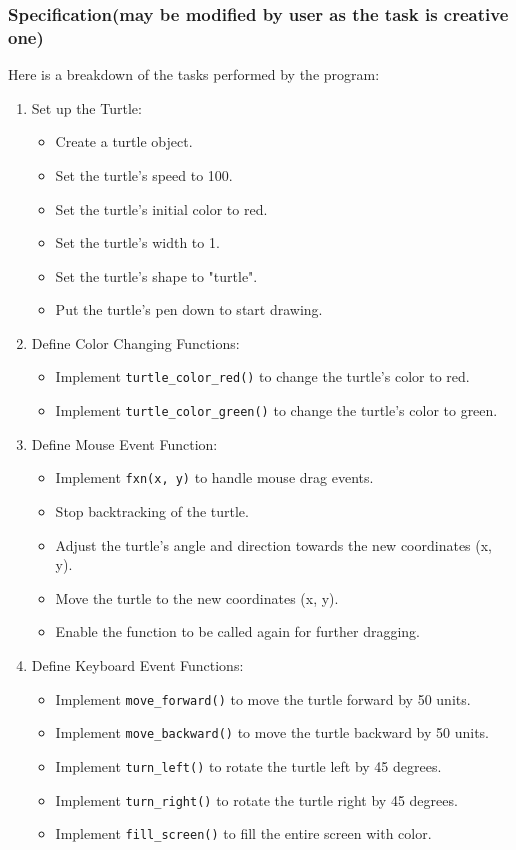 \documentclass[12pt]{book}
\begin{document}
\subsubsection{Specification(may be modified by user as the task is creative one)}
Here is a breakdown of the tasks performed by the program:

\begin{enumerate}[label=\arabic*.]
  \item Set up the Turtle:
    \begin{itemize}
      \item Create a turtle object.
      \item Set the turtle's speed to 100.
      \item Set the turtle's initial color to red.
      \item Set the turtle's width to 1.
      \item Set the turtle's shape to "turtle".
      \item Put the turtle's pen down to start drawing.
    \end{itemize}
  
  \item Define Color Changing Functions:
    \begin{itemize}
      \item Implement \texttt{turtle\_color\_red()} to change the turtle's color to red.
      \item Implement \texttt{turtle\_color\_green()} to change the turtle's color to green.
    \end{itemize}
  
  \item Define Mouse Event Function:
    \begin{itemize}
      \item Implement \texttt{fxn(x, y)} to handle mouse drag events.
      \item Stop backtracking of the turtle.
      \item Adjust the turtle's angle and direction towards the new coordinates (x, y).
      \item Move the turtle to the new coordinates (x, y).
      \item Enable the function to be called again for further dragging.
    \end{itemize}
  
  \item Define Keyboard Event Functions:
    \begin{itemize}
      \item Implement \texttt{move\_forward()} to move the turtle forward by 50 units.
      \item Implement \texttt{move\_backward()} to move the turtle backward by 50 units.
      \item Implement \texttt{turn\_left()} to rotate the turtle left by 45 degrees.
      \item Implement \texttt{turn\_right()} to rotate the turtle right by 45 degrees.
      \item Implement \texttt{fill\_screen()} to fill the entire screen with color.
    \end{itemize}
  

\end{enumerate}
\end{document}
